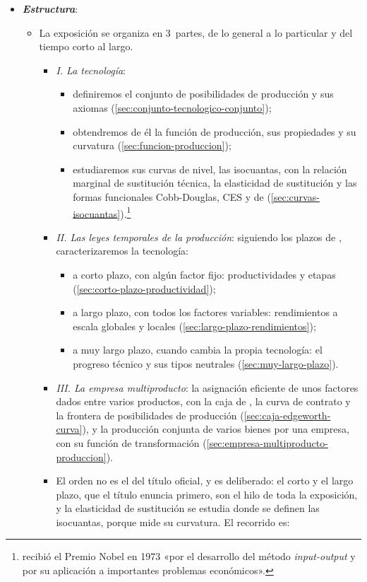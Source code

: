 \documentclass[11pt]{article}
\begin{document}
\begin{itemize}
\item \textbf{\emph{Estructura}}:
  \begin{itemize}
  \item La exposición se organiza en 3~partes, de lo general a lo particular y del tiempo corto al largo.
  \begin{itemize}
  \item \emph{I. La tecnología}:
    \begin{itemize}
    \item definiremos el conjunto de posibilidades de producción y sus axiomas (\ref{sec:conjunto-tecnologico-conjunto});
    \item obtendremos de él la función de producción, sus propiedades y su curvatura (\ref{sec:funcion-produccion});
    \item estudiaremos sus curvas de nivel, las isocuantas, con la relación marginal de sustitución técnica, la elasticidad de sustitución y las formas funcionales Cobb-Douglas, CES y de  (\ref{sec:curvas-isocuantas}).\footnote{ recibió el Premio Nobel en 1973 «por el desarrollo del método \emph{input-output} y por su aplicación a importantes problemas económicos»\nocite{Nobel1973Leontief}.}
    \end{itemize}
  \item \emph{II. Las leyes temporales de la producción}: siguiendo los plazos de , caracterizaremos la tecnología:
    \begin{itemize}
    \item a corto plazo, con algún factor fijo: productividades y etapas (\ref{sec:corto-plazo-productividad});
    \item a largo plazo, con todos los factores variables: rendimientos a escala globales y locales (\ref{sec:largo-plazo-rendimientos});
    \item a muy largo plazo, cuando cambia la propia tecnología: el progreso técnico y sus tipos neutrales (\ref{sec:muy-largo-plazo}).
    \end{itemize}
  \item \emph{III. La empresa multiproducto}: la asignación eficiente de unos factores dados entre varios productos, con la caja de , la curva de contrato y la frontera de posibilidades de producción (\ref{sec:caja-edgeworth-curva}), y la producción conjunta de varios bienes por una empresa, con su función de transformación (\ref{sec:empresa-multiproducto-produccion}).
  \item El orden no es el del título oficial, y es deliberado: el corto y el largo plazo, que el título enuncia primero, son el hilo de toda la exposición, y la elasticidad de sustitución se estudia donde se definen las isocuantas, porque mide su curvatura. El recorrido es:

\end{itemize}
\end{itemize}
\end{itemize}
\end{document}
